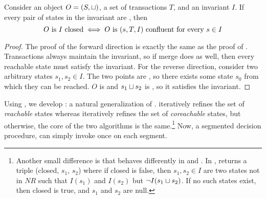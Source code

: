 \begin{theorem}
  Consider an object $O = (S, \sqcup)$, a set of transactions $T$, and an
  invariant $I$. If every pair of states in the invariant are \TIcoreachable{},
  then
  \[
    \text{$O$ is $I$ closed{}}
    \iff
    \text{$O$ is $(s, T, I)$ confluent for every $s \in I$}
  \]
\end{theorem}
\begin{proof}
  The proof of the forward direction is exactly the same as the proof of
  . Transactions always maintain the
  invariant, so if merge does as well, then every reachable state must satisfy
  the invariant.
  For the reverse direction, consider two arbitrary states $s_1, s_2 \in I$.
  The two points are \TIcoreachable{}, so there exists some state $s_0$ from
  which they can be reached. $O$ is \sTIconfluent{} and $s_1 \sqcup s_2$ is
  \sTIreachable{}, so it satisfies the invariant.
\end{proof}

Using , we develop
: a natural generalization
of .
 iteratively refines the set of
\emph{reachable} states whereas
 iteratively refines the
set of \emph{coreachable} states, but otherwise, the core of the two algorithms
is the same.\footnote{%
  Another small difference is that \IsIclosed{} behaves differently in
   and
  . In
  , \IsIclosed{} returns a
  triple (closed, $s_1$, $s_2$) where if closed is false, then $s_1, s_2 \in I$
  are two states not in $NR$ such that $I(s_1)$ and $I(s_2)$ but $\lnot I(s_1
  \sqcup s_2)$. If no such states exist, then closed is true, and $s_1$ and
  $s_2$ are null.
}
Now, a segmented \invariantconfluence{} decision procedure, can simply invoke
 once on each segment.

